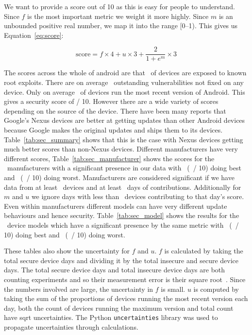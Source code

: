 We want to provide a score out of 10 as this is easy for people to understand.
Since $f$ is the most important metric we weight it more highly.
Since $m$ is an unbounded positive real number, we map it into the range [0--1).
This gives us Equation~\ref{eq:score}:

\begin{equation}
\mathrm{score} = f\times 4 + u \times 3 + \frac{2}{1+e^m} \times 3 \label{eq:score}
\end{equation}

The scores across the whole of android are that \daMeanInsecurityPerc\ of devices are exposed to known root exploits.
There are on average \daMeanOutstandingVulnerabilities\ outstanding vulnerabilities not fixed on any device.
Only on average \daUpdatednessPerc\ of devices run the most recent version of Android.
This gives a security score of \daSecurityScore / 10.
\daTabSecScoressummary
However there are a wide variety of scores depending on the source of the device.
There have been many reports that Google's Nexus devices are better at getting updates than other Android devices because Google makes the original updates and ships them to its devices.
Table~\ref{tab:sec_summary} shows that this is the case with Nexus devices getting much better scores than non-Nexus devices.
\daTabSecScoresmanufacturer
Different manufacturers have very different scores, Table~\ref{tab:sec_manufacturer} shows the scores for the \daNumSigManufacturers\ manufacturers with a significant presence in our data with \daSecScoreBestmanufacturer\ (\daSecScoreBestmanufacturerScore\ / 10) doing best and \daSecScoreWorstmanufacturer\ (\daSecScoreWorstmanufacturerScore\ / 10) doing worst.
Manufacturers are considered significant if we have data from at least \daSigNumDevices\ devices and at least \daSigNumDeviceDays\ days of contributions.
Additionally for $m$ and $u$ we ignore days with less than \daSigNumDevicesDay\ devices contributing to that day's score.
\daTabSecScoresmodel
Even within manufacturers different models can have very different update behaviours and hence security.
Table~\ref{tab:sec_model} shows the results for the \daNumSigModels\ device models which have a significant presence by the same metric with \daSecScoreBestmodel\ (\daSecScoreBestmodelScore\ / 10) doing best and \daSecScoreWorstmodel\ (\daSecScoreWorstmodelScore\ / 10) doing worst.


These tables also show the uncertainty for $f$ and $u$.
$f$ is calculated by taking the total secure device days and dividing it by the total insecure and secure device days.
The total secure device days and total insecure device days are both counting experiments and so their measurement error is their square root~\cite{Taylor1997}.
Since the numbers involved are large, the uncertainty in $f$ is small.
$u$ is computed by taking the sum of the proportions of devices running the most recent version each day, both the count of devices running the maximum version and total count have sqrt uncertainties.
The Python \texttt{uncertainties} library was used to propagate uncertainties through calculations.

